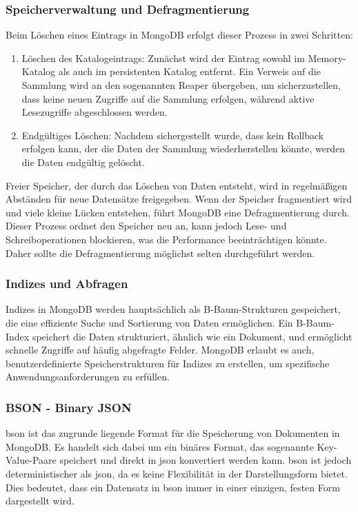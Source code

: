 \subsubsection{Speicherverwaltung und Defragmentierung}
Beim Löschen eines Eintrags in MongoDB erfolgt dieser Prozess in zwei Schritten:
\begin{enumerate}
    \item Löschen des Katalogeintrags: Zunächst wird der Eintrag sowohl im Memory-Katalog als auch im persistenten Katalog entfernt. Ein Verweis auf die Sammlung wird an den sogenannten \glqq Reaper\grqq{} übergeben, um sicherzustellen, dass keine neuen Zugriffe auf die Sammlung erfolgen, während aktive Lesezugriffe abgeschlossen werden.
    \item Endgültiges Löschen: Nachdem sichergestellt wurde, dass kein Rollback erfolgen kann, der die Daten der Sammlung wiederherstellen könnte, werden die Daten endgültig gelöscht.
\end{enumerate}

Freier Speicher, der durch das Löschen von Daten entsteht, wird in regelmäßigen Abständen für neue Datensätze freigegeben. Wenn der Speicher fragmentiert wird und viele kleine Lücken entstehen, führt MongoDB eine Defragmentierung durch. Dieser Prozess ordnet den Speicher neu an, kann jedoch Lese- und Schreiboperationen blockieren, was die Performance beeinträchtigen könnte. Daher sollte die Defragmentierung möglichst selten durchgeführt werden.

\subsubsection{Indizes und Abfragen}
Indizes in MongoDB werden hauptsächlich als B-Baum-Strukturen gespeichert, die eine effiziente Suche und Sortierung von Daten ermöglichen. Ein B-Baum-Index speichert die Daten strukturiert, ähnlich wie ein Dokument, und ermöglicht schnelle Zugriffe auf häufig abgefragte Felder. MongoDB erlaubt es auch, benutzerdefinierte Speicherstrukturen für Indizes zu erstellen, um spezifische Anwendungsanforderungen zu erfüllen. \cite{IamXander2024} \cite{themattman2024}

\subsubsection{BSON - Binary JSON}

\ac{bson} ist das zugrunde liegende Format für die Speicherung von Dokumenten in MongoDB. Es handelt sich dabei um ein binäres Format, das sogenannte Key-Value-Paare speichert und direkt in \ac{json} konvertiert werden kann. \ac{bson} ist jedoch deterministischer als \ac{json}, da es keine Flexibilität in der Darstellungsform bietet. Dies bedeutet, dass ein Datensatz in \ac{bson} immer in einer einzigen, festen Form dargestellt wird.

